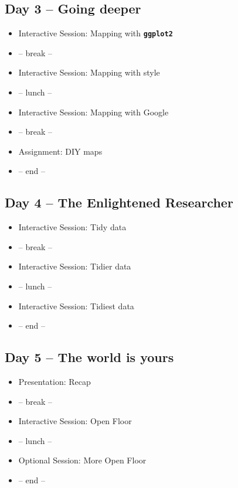 \documentclass[]{book}
\providecommand{\tightlist}{%
  \setlength{\itemsep}{0pt}\setlength{\parskip}{0pt}}
\theoremstyle{definition}
\theoremstyle{definition}
\theoremstyle{definition}
\theoremstyle{remark}
\begin{document}
\subsection*{Day 3 -- Going deeper}\label{day-3-going-deeper}

\begin{itemize}
\tightlist
\item
  Interactive Session: Mapping with \textbf{\texttt{ggplot2}}
\item
  -- break --
\item
  Interactive Session: Mapping with style
\item
  -- lunch --
\item
  Interactive Session: Mapping with Google
\item
  -- break --
\item
  Assignment: DIY maps
\item
  -- end --
\end{itemize}

\subsection*{Day 4 -- The Enlightened
Researcher}\label{day-4-the-enlightened-researcher}

\begin{itemize}
\tightlist
\item
  Interactive Session: Tidy data
\item
  -- break --
\item
  Interactive Session: Tidier data
\item
  -- lunch --
\item
  Interactive Session: Tidiest data
\item
  -- end --
\end{itemize}

\subsection*{Day 5 -- The world is
yours}\label{day-5-the-world-is-yours}

\begin{itemize}
\tightlist
\item
  Presentation: Recap
\item
  -- break --
\item
  Interactive Session: Open Floor
\item
  -- lunch --
\item
  Optional Session: More Open Floor
\item
  -- end --
\end{itemize}
\end{document}
